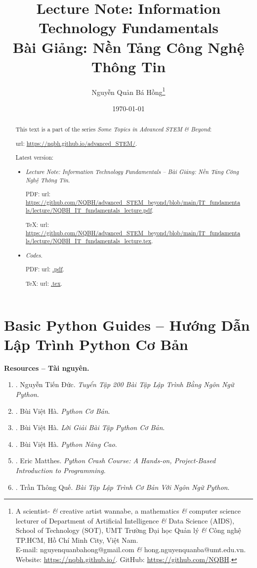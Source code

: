 \documentclass{article}
\title{Lecture Note: Information Technology Fundamentals\\Bài Giảng: Nền Tảng Công Nghệ Thông Tin}
\author{Nguyễn Quản Bá Hồng\footnote{A scientist- {\it\&} creative artist wannabe, a mathematics {\it\&} computer science lecturer of Department of Artificial Intelligence {\it\&} Data Science (AIDS), School of Technology (SOT), UMT Trường Đại học Quản lý {\it\&} Công nghệ TP.HCM, Hồ Chí Minh City, Việt Nam.\\E-mail: {\sf nguyenquanbahong@gmail.com} {\it\&} {\sf hong.nguyenquanba@umt.edu.vn}. Website: \url{https://nqbh.github.io/}. GitHub: \url{https://github.com/NQBH}.}}
\date{\today}
\begin{document}
\maketitle
\begin{abstract}
	This text is a part of the series {\it Some Topics in Advanced STEM \& Beyond}:
	
	{\sc url}: \url{https://nqbh.github.io/advanced_STEM/}.
	
	Latest version:
	\begin{itemize}
		\item {\it Lecture Note: Information Technology Fundamentals -- Bài Giảng: Nền Tảng Công Nghệ Thông Tin}.
		
		PDF: {\sc url}: \url{https://github.com/NQBH/advanced_STEM_beyond/blob/main/IT_fundamentals/lecture/NQBH_IT_fundamentals_lecture.pdf}.
		
		\TeX: {\sc url}: \url{https://github.com/NQBH/advanced_STEM_beyond/blob/main/IT_fundamentals/lecture/NQBH_IT_fundamentals_lecture.tex}.
		\item {\it Codes}.
		
		PDF: {\sc url}: \url{.pdf}.
		
		\TeX: {\sc url}: \url{.tex}.
	\end{itemize}
\end{abstract}
\tableofcontents


\section{Basic Python Guides -- Hướng Dẫn Lập Trình Python Cơ Bản}
\textbf{\textsf{Resources -- Tài nguyên.}}
\begin{enumerate}
	\item \cite{Duc_200_BT_Python}. {\sc Nguyễn Tiến Đức}. {\it Tuyển Tập 200 Bài Tập Lập Trình Bằng Ngôn Ngữ Python}.
	\item \cite{Ha_Python_co_ban}. {\sc Bùi Việt Hà}. {\it Python Cơ Bản}.
	\item \cite{Ha_loi_giai_BT_Python_co_ban}. {\sc Bùi Việt Hà}. {\it Lời Giải Bài Tập Python Cơ Bản}.
	\item \cite{Ha_Python_nang_cao}. {\sc Bùi Việt Hà}. {\it Python Nâng Cao}.
	\item \cite{Matthes2019,Matthes2023}. {\sc Eric Matthes}. {\it Python Crash Course: A Hands-on, Project-Based Introduction to Programming}.
	\item \cite{Que_BT_Python}. {\sc Trần Thông Quế}. {\it Bài Tập Lập Trình Cơ Bản Với Ngôn Ngữ Python}.
\end{enumerate}
\end{document}
